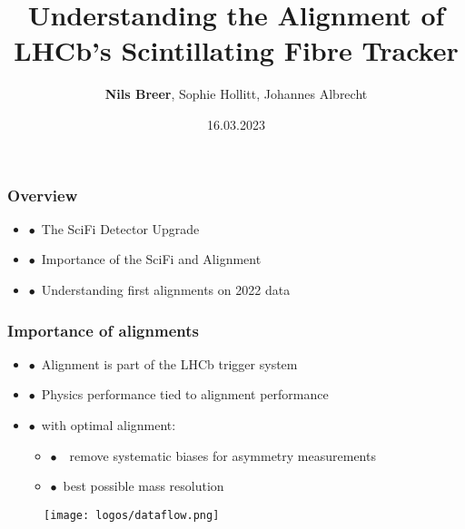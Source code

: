 \documentclass[aspectratio=1610, 12pt, xcolor=dvipsnames]{beamer}
\title{Understanding the Alignment of LHCb's Scintillating Fibre Tracker}
\author[N.Breer]{\textbf{Nils Breer}, Sophie Hollitt, Johannes Albrecht}
\institute{DPG spring Conference, Dresden}
\date{16.03.2023}
\begin{document}
\maketitle

\begin{frame}\frametitle{Overview}
  \begin{itemize}
    \item $\bullet$\, The SciFi Detector Upgrade
    \item $\bullet$\, Importance of the SciFi and Alignment
    \item $\bullet$\, Understanding first alignments on 2022 data
  \end{itemize}
\end{frame}

\begin{frame}\frametitle{Importance of alignments}
  \begin{itemize}
    \item $\bullet$\, Alignment is part of the LHCb trigger system
    \item $\bullet$\, Physics performance tied to alignment performance
    \item $\bullet$\, with optimal alignment:
    \begin{itemize}
      \item $\bullet$\, \to\, remove systematic biases for asymmetry measurements
      \item $\bullet$\, best possible mass resolution
    \end{itemize}
  \end{itemize}
  \begin{figure}
      \texttt{[image: logos/dataflow.png]}%
  \end{figure}
\end{frame}
\end{document}
